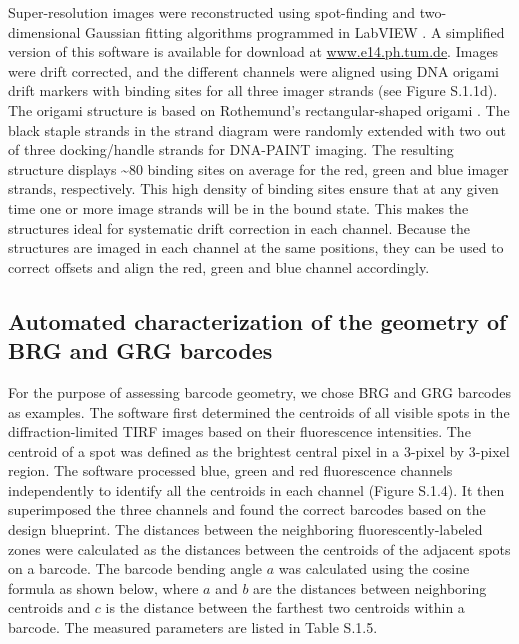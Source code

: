 Super-resolution images were reconstructed using spot-finding and two-dimensional Gaussian fitting algorithms programmed in LabVIEW \citep{steinhauer_superresolution_2008}. A simplified version of this software is available for download at \url{www.e14.ph.tum.de}. Images were drift corrected, and the different channels were aligned using DNA origami drift markers with binding sites for all three imager strands (see Figure S.1.1d). The origami structure is based on Rothemund’s rectangular-shaped origami	\citep{rothemund_folding_2006}. The black staple strands in the strand diagram were randomly extended with two out of three docking/handle strands for DNA-PAINT imaging. The resulting structure displays \textasciitilde80 binding sites on average for the red, green and blue imager strands, respectively. This high density of binding sites ensure that at any given time one or more image strands will be in the bound state.  This makes the structures ideal for systematic drift correction in each channel. Because the structures are imaged in each channel at the same positions, they can be used to correct  offsets and align the red, green and blue channel accordingly. 

\subsection{Automated characterization of the geometry of BRG and GRG barcodes}
For the purpose of assessing  barcode geometry, we chose BRG and GRG barcodes as examples. The software first determined the centroids of all visible spots in the diffraction-limited TIRF images based on their fluorescence intensities. The centroid of a spot was defined as the brightest central pixel in a 3-pixel by 3-pixel region. The software processed blue, green and red fluorescence channels independently to identify all the centroids in each channel (Figure S.1.4). It then superimposed the three channels and found the correct barcodes based on the design blueprint. The distances between the neighboring fluorescently-labeled zones were calculated as the distances between the centroids of the adjacent spots on a barcode. The barcode bending angle $a$ was calculated using the cosine formula as shown below, where $a$ and $b$ are the distances between neighboring centroids and $c$ is the distance between the farthest two centroids within a barcode. The measured parameters are listed in Table S.1.5.





